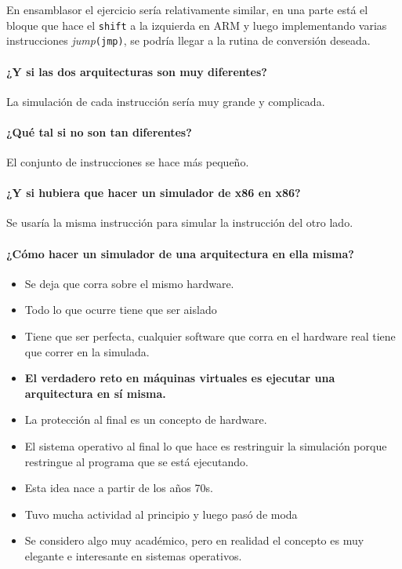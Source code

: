 \documentclass[12pt, times]{simauth}
\begin{document}
En ensamblasor el ejercicio sería relativamente similar, en una parte está el bloque que hace el \texttt{shift} a la izquierda en ARM y luego implementando varias instrucciones \emph{jump}\texttt{(jmp)}, se podría llegar a la rutina de conversión deseada. 

\paragraph{¿Y si las dos arquitecturas son muy diferentes?} La simulación de cada instrucción sería muy grande y complicada.

\paragraph{¿Qué tal si no son tan diferentes?} El conjunto de instrucciones se hace más pequeño.

\begin{center}
 \par
\end{center}

\paragraph{¿Y si hubiera que hacer un simulador de x86 en x86?} Se usaría la misma instrucción para simular la instrucción del otro lado.

\paragraph{¿Cómo hacer un simulador de una arquitectura en ella misma?}
\begin{itemize}
    \item Se deja que corra sobre el mismo hardware.
    \item Todo lo que ocurre tiene que ser aislado
    \item Tiene que ser perfecta, cualquier software que corra en el hardware real tiene que correr en la simulada.
    \item \textbf{El verdadero reto en máquinas virtuales es ejecutar una arquitectura en sí misma.}
    \item La protección al final es un concepto de hardware.
    \item El sistema operativo al final lo que hace es restringuir la simulación porque restringue al programa que se está ejecutando.
    \item Esta idea nace a partir de los años 70s.
    \item Tuvo mucha actividad al principio y luego pasó de moda
    \item Se considero algo muy académico, pero en realidad el concepto es muy elegante e interesante en sistemas operativos.
\end{itemize}
\end{document}
